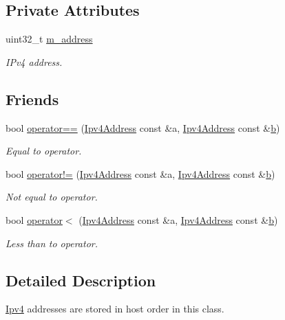 \subsection*{Private Attributes}
\begin{DoxyCompactItemize}
\item 
uint32\+\_\+t \hyperlink{classns3_1_1Ipv4Address_add9fdbe24355d724a2598c4b201d31fb}{m\+\_\+address}
\begin{DoxyCompactList}\small\item\em I\+Pv4 address. \end{DoxyCompactList}\end{DoxyCompactItemize}
\subsection*{Friends}
\begin{DoxyCompactItemize}
\item 
bool \hyperlink{classns3_1_1Ipv4Address_ae0c8c756f2a940c87e7e4b218a378d29}{operator==} (\hyperlink{classns3_1_1Ipv4Address}{Ipv4\+Address} const \&a, \hyperlink{classns3_1_1Ipv4Address}{Ipv4\+Address} const \&\hyperlink{lte__pathloss_8m_a21ad0bd836b90d08f4cf640b4c298e7c}{b})
\begin{DoxyCompactList}\small\item\em Equal to operator. \end{DoxyCompactList}\item 
bool \hyperlink{classns3_1_1Ipv4Address_acf8522719aedb1fc49a1c996cf4a5379}{operator!=} (\hyperlink{classns3_1_1Ipv4Address}{Ipv4\+Address} const \&a, \hyperlink{classns3_1_1Ipv4Address}{Ipv4\+Address} const \&\hyperlink{lte__pathloss_8m_a21ad0bd836b90d08f4cf640b4c298e7c}{b})
\begin{DoxyCompactList}\small\item\em Not equal to operator. \end{DoxyCompactList}\item 
bool \hyperlink{classns3_1_1Ipv4Address_a6737f73a90a549a8bc20616b501b6cc7}{operator$<$} (\hyperlink{classns3_1_1Ipv4Address}{Ipv4\+Address} const \&a, \hyperlink{classns3_1_1Ipv4Address}{Ipv4\+Address} const \&\hyperlink{lte__pathloss_8m_a21ad0bd836b90d08f4cf640b4c298e7c}{b})
\begin{DoxyCompactList}\small\item\em Less than to operator. \end{DoxyCompactList}\end{DoxyCompactItemize}


\subsection{Detailed Description}
\hyperlink{classns3_1_1Ipv4}{Ipv4} addresses are stored in host order in this class. 

